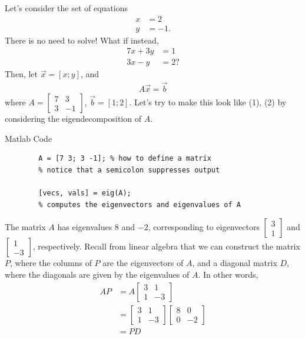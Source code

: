 \documentclass{ximera}
\begin{document}
\begin{example}
    Let's consider the set of equations
    \begin{align}
        x &= 2 \\
        y &= -1.
    \end{align}
    There is no need to solve!
    What if instead,
    \begin{align}
        7x+3y &= 1
        \\
        3x-y &= 2?
    \end{align}
    Then, %
    let $\vec{x} = [x;y]$, and
    \begin{align}
    A\vec{x} = \vec{b}
    \end{align}
    where $A = \begin{bmatrix}
        7 &3 \\3 & -1 
    \end{bmatrix}$, $\vec{b} = [1;2]$.
    Let's try to make this look like (1), (2) by considering the eigendecomposition of $A$.
    
    Matlab Code
    \begin{verbatim}
        A = [7 3; 3 -1]; % how to define a matrix
        % notice that a semicolon suppresses output
        
        [vecs, vals] = eig(A); 
        % computes the eigenvectors and eigenvalues of A
    \end{verbatim}

    The matrix $A$ has eigenvalues $8$ and $-2$, corresponding to eigenvectors $\begin{bmatrix} 3\\1 \end{bmatrix}$ and $\begin{bmatrix} 1\\-3 \end{bmatrix}$, respectively.  Recall from linear algebra that we can construct the matrix $P$, where the columns of $P$ are the eigenvectors of $A$, and a diagonal matrix $D$, where the diagonals are given by the eigenvalues of $A$.  In other words,
\begin{align}
    AP &= A\begin{bmatrix} 3 & 1\\ 1 & -3 \end{bmatrix} \\
    &= \begin{bmatrix} 3 & 1\\ 1 & -3 \end{bmatrix}\begin{bmatrix} 8 & 0\\ 0 & -2 \end{bmatrix}
    \\&= PD
\end{align}


\end{example}
\end{document}
